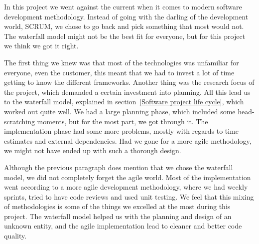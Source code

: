 In this project we went against the current when it comes to modern software development methodology. Instead of going with the darling of the development world, SCRUM, we chose to go back and pick something that most would not. The waterfall model might not be the best fit for everyone, but for this project we think we got it right.

The first thing we knew was that most of the technologies was unfamiliar for everyone, even the customer, this meant that we had to invest a lot of time getting to know the different frameworks. Another thing was the research focus of the project, which demanded a certain investment into planning. All this lead us to the waterfall model, explained in section~\ref{Software project life cycle}, which worked out quite well. We had a large planning phase, which included some head-scratching moments, but for the most part, we got through it. The implementation phase had some more problems, mostly with regards to time estimates and external dependencies. Had we gone for a more agile methodology, we might not have ended up with such a thorough design.

Although the previous paragraph does mention that we chose the waterfall model, we did not completely forget the agile world. Most of the implementation went according to a more agile development methodology, where we had weekly sprints, tried to have code reviews and used unit testing. We feel that this mixing of methodologies is some of the things we excelled at the most during this project. The waterfall model helped us with the planning and design of an unknown entity, and the agile implementation lead to cleaner and better code quality.
